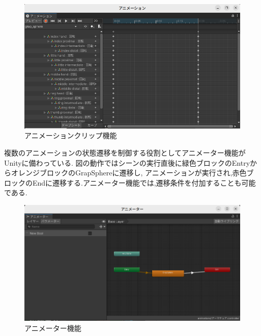 \documentclass{ltjsreport}
\begin{document}
			\begin{figure}[H]
			\centering
			\includegraphics[width = 12cm]{../figs/animationclip.png}
			\caption{アニメーションクリップ機能}
			\label{fig:animationclip}
			\end{figure}
\vspace{-15pt}
			複数のアニメーションの状態遷移を制御する役割としてアニメーター機能がUnityに備わっている.
			図の動作ではシーンの実行直後に緑色ブロックのEntryからオレンジブロックのGrapSphereに遷移し,
			アニメーションが実行され,赤色ブロックのEndに遷移する.アニメーター機能では,遷移条件を付加することも可能である.

			\begin{figure}[H]
			\centering
			\includegraphics[width = 12cm]{../figs/animaterexample.png}
			\caption{アニメーター機能}
			\label{fig:animater}
			\end{figure}
\vspace{-15pt}
\end{document}
